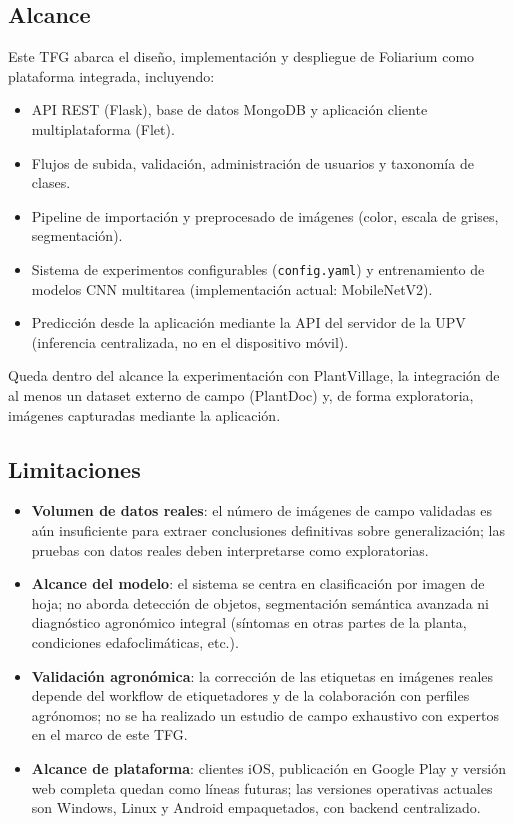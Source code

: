 \documentclass[11pt,spanish,listoffigures,listoftables]{tfgetsinf}
\begin{document}
\subsection{Alcance}

Este TFG abarca el diseño, implementación y despliegue de Foliarium como plataforma integrada, incluyendo:

\begin{itemize}
    \item API REST (Flask), base de datos MongoDB y aplicación cliente multiplataforma (Flet).
    \item Flujos de subida, validación, administración de usuarios y taxonomía de clases.
    \item Pipeline de importación y preprocesado de imágenes (color, escala de grises, segmentación).
    \item Sistema de experimentos configurables (\texttt{config.yaml}) y entrenamiento de modelos CNN multitarea (implementación actual: MobileNetV2).
    \item Predicción desde la aplicación mediante la API del servidor de la UPV (inferencia centralizada, no en el dispositivo móvil).
\end{itemize}

Queda dentro del alcance la experimentación con PlantVillage, la integración de al menos un dataset externo de campo (PlantDoc) y, de forma exploratoria, imágenes capturadas mediante la aplicación.

\subsection{Limitaciones}

\begin{itemize}
    \item \textbf{Volumen de datos reales}: el número de imágenes de campo validadas es aún insuficiente para extraer conclusiones definitivas sobre generalización; las pruebas con datos reales deben interpretarse como exploratorias.
    \item \textbf{Alcance del modelo}: el sistema se centra en clasificación por imagen de hoja; no aborda detección de objetos, segmentación semántica avanzada ni diagnóstico agronómico integral (síntomas en otras partes de la planta, condiciones edafoclimáticas, etc.).
    \item \textbf{Validación agronómica}: la corrección de las etiquetas en imágenes reales depende del workflow de etiquetadores y de la colaboración con perfiles agrónomos; no se ha realizado un estudio de campo exhaustivo con expertos en el marco de este TFG.
    \item \textbf{Alcance de plataforma}: clientes iOS, publicación en Google Play y versión web completa quedan como líneas futuras; las versiones operativas actuales son Windows, Linux y Android empaquetados, con backend centralizado.
\end{itemize}
\end{document}
